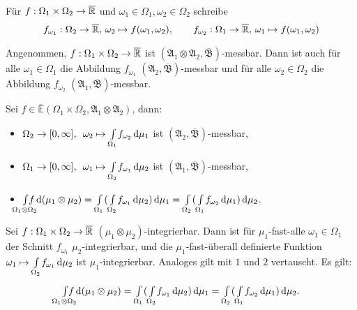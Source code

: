 \documentclass{cheat-sheet}
\newcommand{\Alg}{\mathfrak{A}} %
\newcommand{\Bor}{\mathfrak{B}} %
\newcommand{\E}{\mathbb{E}} %
\theoremstyle{definition}
\begin{document}
\begin{nota}
  Für $f : \Omega_1 \times \Omega_2 \to \overline{\mathbb{R}}$ und $\omega_1 \in \Omega_1, \omega_2 \in \Omega_2$ schreibe
  \begin{align*}
    f_{\omega_1} : \Omega_2 \to \overline{\mathbb{R}}, \, \omega_2 \mapsto f(\omega_1, \omega_2), \qquad
    f_{\omega_2} : \Omega_1 \to \overline{\mathbb{R}}, \, \omega_1 \mapsto f(\omega_1, \omega_2)
  \end{align*}
\end{nota}

\begin{lem}
  Angenommen, $f : \Omega_1 \times \Omega_2 \to \overline{\mathbb{R}}$ ist $(\Alg_1 \otimes \Alg_2, \overline{\Bor})$-messbar. Dann ist auch für alle $\omega_1 \in \Omega_1$ die Abbildung $f_{\omega_1}$ $(\Alg_2, \overline{\Bor})$-messbar und für alle $\omega_2 \in \Omega_2$ die Abbildung $f_{\omega_2}$ $(\Alg_1, \overline{\Bor})$-messbar.
\end{lem}

\begin{satz}[Tonelli]
  Sei $f \in \overline{\E}(\Omega_1 \times \Omega_2, \Alg_1 \otimes \Alg_2)$, dann:
  \begin{itemize}
    \item $\Omega_2 \to [0, \infty], \enspace \omega_2 \mapsto {\textstyle \int\limits_{\Omega_1}^{}} f_{\omega_2} \,\mathrm{d} \mu_1$ \enspace ist $(\Alg_2, \overline{\Bor})$-messbar,
    \item $\Omega_1 \to [0, \infty], \enspace \omega_1 \mapsto {\textstyle \int\limits_{\Omega_2}^{}} f_{\omega_1} \,\mathrm{d} \mu_2$ \enspace ist $(\Alg_1, \overline{\Bor})$-messbar,
    \item \quad $\Int{\mathclap{\Omega_1 \otimes \Omega_2}}{}{f}{(\mu_1 \otimes \mu_2)} = \Int{\Omega_1}{}{(\Int{\Omega_2}{}{f_{\omega_1}}{\mu_2})}{\mu_1} = \Int{\Omega_2}{}{(\Int{\Omega_1}{}{f_{\omega_2}}{\mu_1})}{\mu_2}$.
  \end{itemize}
\end{satz}

\begin{satz}[Fubini]
  Sei $f : \Omega_1 \times \Omega_2 \to \overline{\mathbb{R}}$ $(\mu_1 \otimes \mu_2)$-integrierbar. Dann ist für $\mu_1$-fast-alle $\omega_1 \in \Omega_1$ der Schnitt $f_{\omega_1}$ $\mu_2$-integrierbar, und die $\mu_1$-fast-überall definierte Funktion $\omega_1 \mapsto {\textstyle \int\limits_{\Omega_2}^{}} f_{\omega_1} \,\mathrm{d} \mu_2$ ist $\mu_1$-integrierbar. Analoges gilt mit $1$ und $2$ vertauscht. Es gilt:
  \[ \Int{\mathclap{\Omega_1 \otimes \Omega_2}}{}{f}{(\mu_1 \otimes \mu_2)} = \Int{\Omega_1}{}{(\Int{\Omega_2}{}{f_{\omega_1}}{\mu_2})}{\mu_1} = \Int{\Omega_2}{}{(\Int{\Omega_1}{}{f_{\omega_2}}{\mu_1})}{\mu_2}. \]
\end{satz}
\end{document}
